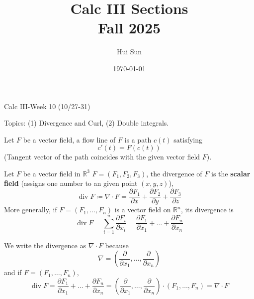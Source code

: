 \documentclass[openany]{book}
\title{Calc III Sections
\\ 
\vspace{0.4cm}
\large Fall 2025}
\date{\today}
\author{Hui Sun}
\newcommand{\R}{\mathbb{R}}
\newcommand{\diverg}{\operatorname{div}}
\begin{document}
\maketitle

\newpage


\begin{center}
    \Large Calc III-Week 10 (10/27-31)
\end{center}

\renewcommand\thesection{\arabic{section}}

\noindent
Topics: (1) Divergence and Curl, (2) Double integrals.



\begin{defn}
    Let ${F}$ be a vector field, a flow line of $F$ is a path $c(t)$ satisfying 
    \begin{equation*}
        c'(t)=F(c(t))
    \end{equation*}
    (Tangent vector of the path coincides with the given vector field ${F}$).
\end{defn}

\begin{defn}[divergence]
    Let ${F}$ be a vector field in $\R^3$ $F=(F_1,F_2,F_3)$, the divergence of ${F}$ is the \textbf{scalar field} (assigns one number to an given point $(x, y, z)$), 
    \begin{equation*}
        \diverg F\coloneq\nabla\cdot F=\frac{\partial F_1}{\partial x}+\frac{\partial F_2}{\partial y}+\frac{\partial F_3}{\partial z}
    \end{equation*}
    More generally, if $F=(F_1,\dots, F_n)$ is a vector field on $\R^n$, its divergence is 
    \begin{equation*}
        \diverg F=\sum_{i=1}^n\frac{\partial F_i}{\partial x_i}=\frac{\partial F_1}{\partial x_1}+\dots+\frac{\partial F_n}{\partial x_n}
    \end{equation*}
\end{defn}

\begin{remark}
    We write the divergence as $\nabla\cdot F$ because 
    \begin{equation*}
        \nabla=\left(\frac{\partial}{\partial x_1}, \dots, \frac{\partial}{\partial x_n}\right)
    \end{equation*}
    and if $F=(F_1,\dots, F_n)$, 
    \begin{equation*}
        \diverg F=\frac{\partial F_1}{\partial x_1}+\dots+\frac{\partial F_n}{\partial x_n}=\left(\frac{\partial}{\partial x_1}, \dots, \frac{\partial}{\partial x_n}\right)\cdot(F_1,\dots, F_n)=\nabla\cdot F
    \end{equation*}
\end{remark}
\end{document}
